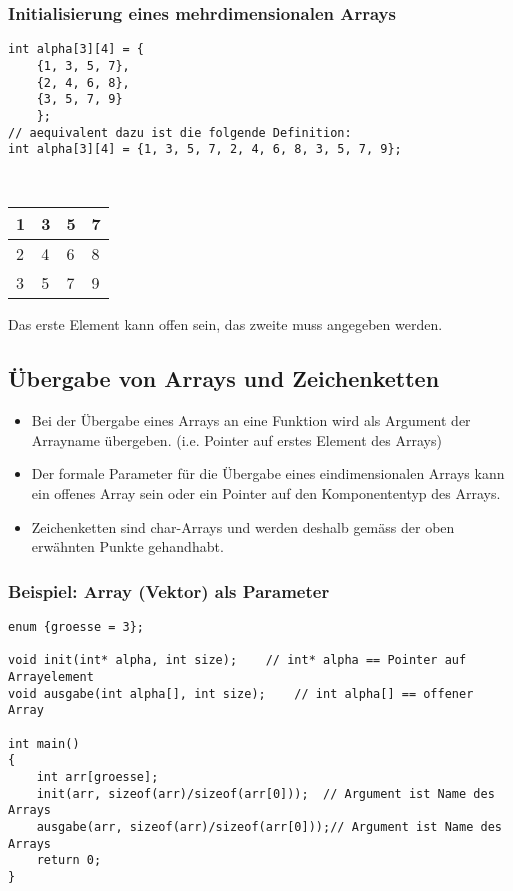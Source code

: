 \subsubsection{Initialisierung eines mehrdimensionalen Arrays\hfill}
\label{sec:Initialisierung eines mehrdimensionalen Arrays}
\noindent
\begin{minipage}{\linewidth}
\begin{lstlisting}
int alpha[3][4] = {
	{1, 3, 5, 7},
	{2, 4, 6, 8},
	{3, 5, 7, 9}
	};
// aequivalent dazu ist die folgende Definition:
int alpha[3][4] = {1, 3, 5, 7, 2, 4, 6, 8, 3, 5, 7, 9};
\end{lstlisting}
\end{minipage}
\\
\centering
\begin{tabularx}{0.25\textwidth}{|X|X|X|X|}
	\hline
	1 & 3 & 5 & 7\\
	\hline
	2 & 4 & 6 & 8\\
	\hline
	3 & 5 & 7 & 9\\
	\hline
\end{tabularx}
\flushleft
\begin{hinweis}
	Das erste Element kann offen sein, das zweite muss angegeben werden.
\end{hinweis}



\subsection{Übergabe von Arrays und Zeichenketten\hfill}
\label{sec:Uebergabe von Arrays und Zeichenketten}
\begin{itemize}
	\item Bei der Übergabe eines Arrays an eine Funktion wird als Argument der Arrayname übergeben. (i.e. Pointer auf erstes Element des Arrays)
	\item Der formale Parameter für die Übergabe eines eindimensionalen Arrays kann ein offenes Array sein oder ein Pointer auf den Komponententyp des Arrays.
	\item Zeichenketten sind char-Arrays und werden deshalb gemäss der oben erwähnten Punkte gehandhabt.
\end{itemize}

\subsubsection{Beispiel: Array (Vektor) als Parameter\hfill}
\label{sec:Beispiel: Array (Vektor) als Parameter}
\noindent
\begin{minipage}{\linewidth}
\begin{lstlisting}
enum {groesse = 3};

void init(int* alpha, int size);	// int* alpha == Pointer auf Arrayelement
void ausgabe(int alpha[], int size);	// int alpha[] == offener Array

int main()
{
	int arr[groesse];
	init(arr, sizeof(arr)/sizeof(arr[0]));	// Argument ist Name des Arrays
	ausgabe(arr, sizeof(arr)/sizeof(arr[0]));// Argument ist Name des Arrays
	return 0;
}
\end{lstlisting}
\end{minipage}

